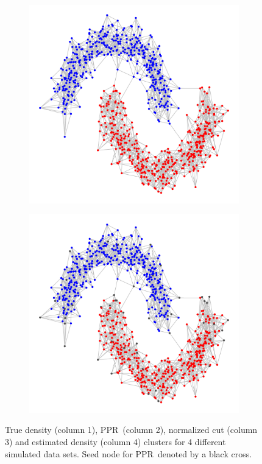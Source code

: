 \documentclass{article}
\newcommand{\1}{\mathbf{1}}
\newcommand{\pprspace}{{\sc PPR~}}
\theoremstyle{aldenthm}
\theoremstyle{aldenrmrk}
\begin{document}
\begin{figure}
\begin{adjustbox}{minipage=\linewidth,scale=0.8}
\begin{subfigure}{.24\linewidth}
			\caption{}
		\end{subfigure}
		\begin{subfigure}{.24\linewidth}
			\includegraphics[width=\linewidth]{example2plots/row4_conductance_cluster}
			\caption{}
		\end{subfigure}
		\begin{subfigure}{.24\linewidth}
			\includegraphics[width=\linewidth]{example2plots/row4_density_cluster}
			\caption{}
		\end{subfigure}
		\caption{True density (column 1), \pprspace (column 2), normalized cut (column 3) and estimated density (column 4) clusters for 4 different simulated data sets. Seed node for \pprspace denoted by a black cross.}
		\label{fig:fig2}
	\end{adjustbox}
\end{figure}
\end{document}
